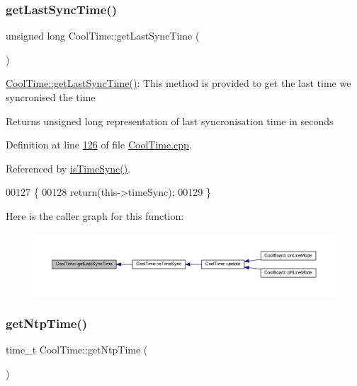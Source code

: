 \subsubsection{\texorpdfstring{get\+Last\+Sync\+Time()}{getLastSyncTime()}}
{\footnotesize\ttfamily unsigned long Cool\+Time\+::get\+Last\+Sync\+Time (\begin{DoxyParamCaption}{ }\end{DoxyParamCaption})}

\hyperlink{class_cool_time_a5d17f707a9d337720493b2bce9d41c21}{Cool\+Time\+::get\+Last\+Sync\+Time()}\+: This method is provided to get the last time we syncronised the time

\begin{DoxyReturn}{Returns}
unsigned long representation of last syncronisation time in seconds 
\end{DoxyReturn}


Definition at line \hyperlink{_cool_time_8cpp_source_l00126}{126} of file \hyperlink{_cool_time_8cpp_source}{Cool\+Time.\+cpp}.



Referenced by \hyperlink{_cool_time_8cpp_source_l00141}{is\+Time\+Sync()}.


\begin{DoxyCode}
00127 \{
00128     \textcolor{keywordflow}{return}(this->timeSync);
00129 \}
\end{DoxyCode}
Here is the caller graph for this function\+:
\nopagebreak
\begin{figure}[H]
\begin{center}
\leavevmode
\includegraphics[width=350pt]{class_cool_time_a5d17f707a9d337720493b2bce9d41c21_icgraph}
\end{center}
\end{figure}
\mbox{\label{class_cool_time_a41fbbbfd651c2079f54d4b2911e4c705}} 
\subsubsection{\texorpdfstring{get\+Ntp\+Time()}{getNtpTime()}}
{\footnotesize\ttfamily time\+\_\+t Cool\+Time\+::get\+Ntp\+Time (\begin{DoxyParamCaption}{ }\end{DoxyParamCaption})}

